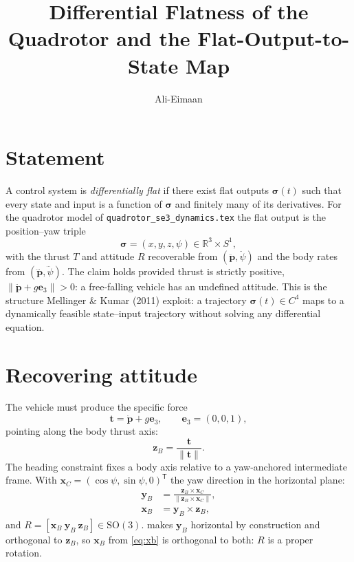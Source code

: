 \documentclass[11pt]{article}
\title{Differential Flatness of the Quadrotor and the Flat-Output-to-State Map}
\author{Ali-Eimaan}
\date{}
\newcommand{\R}{\mathbb{R}}
\newcommand{\SO}{\mathrm{SO}(3)}
\begin{document}
\maketitle

\section{Statement}

A control system is \emph{differentially flat} if there exist flat outputs
$\bm\sigma(t)$ such that every state and input is a function of $\bm\sigma$ and finitely
many of its derivatives. For the quadrotor model of \texttt{quadrotor\_se3\_dynamics.tex}
the flat output is the position--yaw triple
\begin{equation}
  \bm\sigma = (x, y, z, \psi) \in \R^3 \times S^1,
  \label{eq:flatout}
\end{equation}
with the thrust $T$ and attitude $R$ recoverable from $(\ddot{\bm p}, \ddot\psi)$ and the
body rates from $(\dddot{\bm p}, \dddot\psi)$. The claim holds provided thrust is strictly
positive, $\|\ddot{\bm p} + g\bm e_3\| > 0$: a free-falling vehicle has an undefined
attitude. This is the structure Mellinger \& Kumar (2011) exploit: a trajectory
$\bm\sigma(t) \in C^4$ maps to a dynamically feasible state--input trajectory without
solving any differential equation.

\section{Recovering attitude}

The vehicle must produce the specific force
\begin{equation}
  \bm t = \ddot{\bm p} + g \bm e_3, \qquad \bm e_3 = (0,0,1),
  \label{eq:tvec}
\end{equation}
pointing along the body thrust axis:
\begin{equation}
  \bm z_B = \frac{\bm t}{\|\bm t\|}.
  \label{eq:zb}
\end{equation}
The heading constraint fixes a body axis relative to a yaw-anchored intermediate frame. With
$\bm x_C = (\cos\psi, \sin\psi, 0)^{\mathsf T}$ the yaw direction in the horizontal plane:
\begin{align}
  \bm y_B &= \frac{\bm z_B \times \bm x_C}{\|\bm z_B \times \bm x_C\|},
  \label{eq:yb} \\
  \bm x_B &= \bm y_B \times \bm z_B,
  \label{eq:xb}
\end{align}
and $R = [\bm x_B \ \bm y_B \ \bm z_B] \in \SO$.  makes $\bm y_B$ horizontal by
construction and orthogonal to $\bm z_B$, so $\bm x_B$ from \eqref{eq:xb} is orthogonal to
both: $R$ is a proper rotation.
\end{document}
